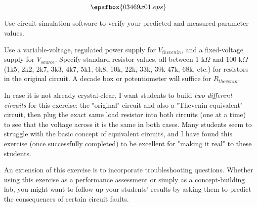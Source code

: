 

$$\epsfbox{03469x01.eps}$$

\vfil \eject






Use circuit simulation software to verify your predicted and measured parameter values.







Use a variable-voltage, regulated power supply for $V_{thevenin}$, and a fixed-voltage supply for $V_{source}$.  Specify standard resistor values, all between 1 k$\Omega$ and 100 k$\Omega$ (1k5, 2k2, 2k7, 3k3, 4k7, 5k1, 6k8, 10k, 22k, 33k, 39k 47k, 68k, etc.) for resistors in the original circuit.  A decade box or potentiometer will suffice for $R_{thevenin}$.

In case it is not already crystal-clear, I want students to build {\it two different circuits} for this exercise: the "original" circuit and also a "Thevenin equivalent" circuit, then plug the exact same load resistor into both circuits (one at a time) to see that the voltage across it is the same in both cases.  Many students seem to struggle with the basic concept of equivalent circuits, and I have found this exercise (once successfully completed) to be excellent for "making it real" to these students.

An extension of this exercise is to incorporate troubleshooting questions.  Whether using this exercise as a performance assessment or simply as a concept-building lab, you might want to follow up your students' results by asking them to predict the consequences of certain circuit faults.




